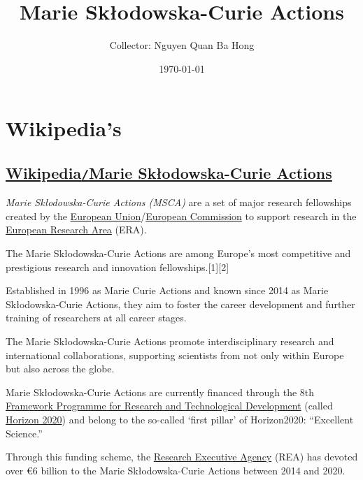 \documentclass[oneside]{book}
\title{Marie Sk\l odowska-Curie Actions}
\author{Collector: Nguyen Quan Ba Hong}
\date{\today}
\numberwithin{equation}{section}
\begin{document}
\maketitle
\setcounter{secnumdepth}{6}
\setcounter{tocdepth}{6}
\tableofcontents


\chapter{Wikipedia's}

\section{\href{https://en.wikipedia.org/wiki/Marie_Sklodowska-Curie_Actions}{Wikipedia\texttt{/}Marie Sk\l odowska-Curie Actions}}

\textit{Marie Skłodowska-Curie Actions (MSCA)} are a set of major research fellowships created by the \href{https://en.wikipedia.org/wiki/European_Union}{European Union}/\href{https://en.wikipedia.org/wiki/European_Commission}{European Commission} to support research in the \href{https://en.wikipedia.org/wiki/European_Research_Area}{European Research Area} (ERA).

The Marie Skłodowska-Curie Actions are among Europe's most competitive and prestigious research and innovation fellowships.[1][2]

%
Established in 1996 as Marie Curie Actions and known since 2014 as Marie Skłodowska-Curie Actions, they aim to foster the career development and further training of researchers at all career stages.

The Marie Skłodowska-Curie Actions promote interdisciplinary research and international collaborations, supporting scientists from not only within Europe but also across the globe.

%
Marie Skłodowska-Curie Actions are currently financed through the 8th \href{https://en.wikipedia.org/wiki/Framework_Programmes_for_Research_and_Technological_Development}{Framework Programme for Research and Technological Development} (called \href{https://en.wikipedia.org/wiki/Horizon_2020}{Horizon 2020}) and belong to the so-called `first pillar' of Horizon2020: ``Excellent Science.''

Through this funding scheme, the \href{https://en.wikipedia.org/wiki/Research_Executive_Agency}{Research Executive Agency} (REA) has devoted over €6 billion to the Marie Skłodowska-Curie Actions between 2014 and 2020.
\end{document}
